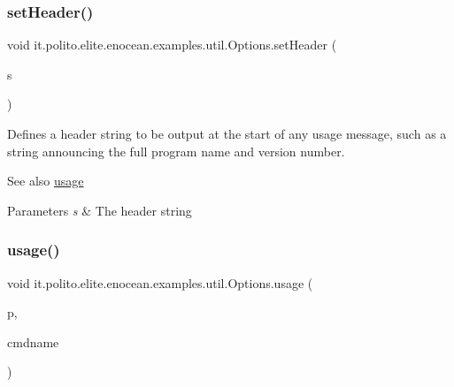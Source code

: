 \subsubsection{\texorpdfstring{set\+Header()}{setHeader()}}
{\footnotesize\ttfamily void it.\+polito.\+elite.\+enocean.\+examples.\+util.\+Options.\+set\+Header (\begin{DoxyParamCaption}\item[{String}]{s }\end{DoxyParamCaption})}

Defines a header string to be output at the start of any usage message, such as a string announcing the full program name and version number. 

\begin{DoxySeeAlso}{See also}
\hyperlink{classit_1_1polito_1_1elite_1_1enocean_1_1examples_1_1util_1_1_options_a2147573c225eeaac81cef1f12b6f3235}{usage} 
\end{DoxySeeAlso}

\begin{DoxyParams}{Parameters}
{\em s} & The header string \\
\hline
\end{DoxyParams}
\hypertarget{classit_1_1polito_1_1elite_1_1enocean_1_1examples_1_1util_1_1_options_a2147573c225eeaac81cef1f12b6f3235}{}\label{classit_1_1polito_1_1elite_1_1enocean_1_1examples_1_1util_1_1_options_a2147573c225eeaac81cef1f12b6f3235} 
\subsubsection{\texorpdfstring{usage()}{usage()}}
{\footnotesize\ttfamily void it.\+polito.\+elite.\+enocean.\+examples.\+util.\+Options.\+usage (\begin{DoxyParamCaption}\item[{Print\+Stream}]{p,  }\item[{String}]{cmdname }\end{DoxyParamCaption})}

